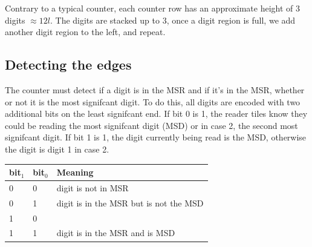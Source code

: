 Contrary to a typical counter, each counter row has an approximate height of 3 digits $\approx 12l$.
The digits are stacked up to 3, once a digit region is full, we add another digit region to the left, and repeat.

\subsection{Detecting the edges}

The counter must detect if a digit is in the MSR and if it's in the MSR, whether or not it is the most
signifcant digit. To do this, all digits are encoded with two additional bits on the least signifcant end.
If bit 0 is 1, the reader tiles know they could be reading the most signifcant digit (MSD) or in case 2, the
second most signifcant digit. If bit 1 is 1, the digit currently being read is the MSD, otherwise
the digit is digit 1 in case 2.

\begin{table}[H]
    \begin{tabular}{|l|l|l|}
    \hline
        bit$_1$ & bit$_0$ & Meaning                                \\ \hline
            0   & 0       & digit is not in MSR                    \\ \hline
            0   & 1       & digit is in the MSR but is not the MSD \\ \hline
            1   & 0       &                                        \\ \hline
            1   & 1       & digit is in the MSR and is MSD         \\ \hline
    \end{tabular}
\end{table}